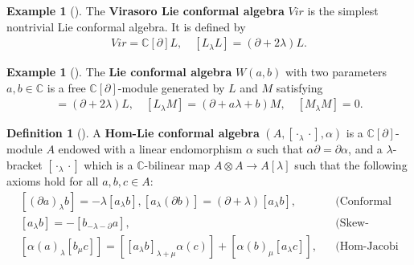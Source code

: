 \documentclass[11pt,letterpaper,reqno]{amsart}
\theoremstyle{definition}
\newtheorem{definition}[theorem]{Definition}
\newtheorem{example}[theorem]{Example}
\numberwithin{equation}{section}
\begin{document}
\begin{example}[{\cite{DAK98}}]
The {\bf Virasoro Lie conformal algebra} $Vir$ is the simplest nontrivial Lie conformal algebra. It is defined by
   \begin{align}
        Vir=\mathbb{C}[\partial]L,\quad[L_ \lambda L]=(\partial+2\lambda)L.
   \end{align}
\end{example}
\begin{example}[{\cite{LHW20}}]
   The {\bf Lie conformal algebra} $W(a,b)$ with two parameters $a,b\in \mathbb{C}$ is a free $\mathbb{C}[\partial]$-module generated by $L$ and $M$ satisfying
   \begin{align*}
        [L_ \lambda L]=(\partial+2\lambda)L,\quad[L_ \lambda M]=(\partial+a\lambda+b)M,\quad[M_ \lambda M]=0.
   \end{align*}
\end{example}

\begin{definition}[{\cite{Yuan14}}]
A {\bf Hom-Lie conformal algebra} $(A,[\cdot_{\lambda}\cdot],\alpha)$ is a $\mathbb{C}[\partial]$-module $A$ endowed with a linear endomorphism $\alpha$ such that $\alpha\partial=\partial\alpha$, and a $\lambda$-bracket $[\cdot_{\lambda}\cdot]$ which is a $\mathbb{C}$-bilinear map $A \otimes A \rightarrow A [\lambda]$ such that the following axioms hold for all $a,b,c \in A$:
   \begin{align}
      &{\left[(\partial a)_\lambda b\right]=-\lambda\left[a_\lambda b\right],\left[a_\lambda (\partial b)\right] }=(\partial+\lambda)\left[a_\lambda b\right], &&\text{(Conformal sesquilinearity)} \\
      &{\left[a_\lambda b\right] } =-\left[b_{-\lambda-\partial} a\right], &&\text{(Skew-symmetry)}\\
      &{\left[\alpha(a)_\lambda\left[b_\mu c\right]\right] } =[\left[a_\lambda b\right]_{\lambda+\mu} \alpha(c)]+\left[\alpha(b)_\mu\left[a_\lambda c\right]\right], &&\text{(Hom-Jacobi identity)}
   \end{align}
\end{definition}
\end{document}
